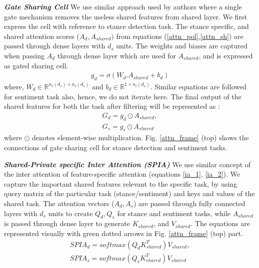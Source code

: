 \documentclass[letterpaper]{article} %
\begin{document}
\par \noindent \textbf{\textit{Gate Sharing Cell}} We use similar approach used by authors \cite{wu2019different} where a single gate mechanism removes the useless shared features from shared layer. We first express the cell with reference to stance detection task. The stance specific, and shared attention scores ($A_d, A_{shared})$ from equations (\ref{attn_pol},\ref{attn_sh}) are passed through dense layers with $d_s$ units. The weights and biases are captured when passing $A_d$ through dense layer which are used for $A_{shared}$, and is expressed as gated sharing cell. %
\begin{eqnarray}
     g_d = \sigma(W_d . A_{shared}  + b_d)
    \label{eq:lstm}
\end{eqnarray}
where, $W_{d} \in \mathbb{R}^{n_{t}(d_s) \times n_{t}(d_s)} $ and $b_{d} \in \mathbb{R}^{1 \times n_{t}(d_s)} $. Similar equations are followed for sentiment task also, hence, we do not iterate here.
The final output of the shared features for both the task after filtering will be represented as :
\begin{gather}
    G_d    = g_d \odot A_{shared}, \\
    G_s    = g_s \odot A_{shared}
\end{gather}
where $\odot$ denotes element-wise multiplication. Fig. \ref{attn_frame} (top) shows the connections of gate sharing cell for stance detection and sentiment tasks.
\par \noindent \textbf{\textit{Shared-Private specific Inter Attention (SPIA)}} We use similar concept of the inter attention of feature-specific attention (equations \ref{ia_1}, \ref{ia_2}). We capture the important shared features relevant to the specific task, by using query matrix of the particular task (stance/sentiment) and keys and values of the shared task. The attention vectors ($A_d,A_s$) are passed through fully connected layers with $d_s$ units to create %
$Q_d,Q_s$ for stance and sentiment tasks, while $A_{shared}$ is passed through dense layer to generate $K_{shared}$, and $V_{shared}$. %
The equations are represented visually with green dotted arrows in Fig. \ref{attn_frame} (top) part.
\begin{gather}
    SPIA_{d} = softmax(Q_{d}K^T_{shared})V_{shared}, \\
    SPIA_{s} = softmax(Q_{s}K^T_{shared})V_{shared}
\end{gather}
\end{document}

